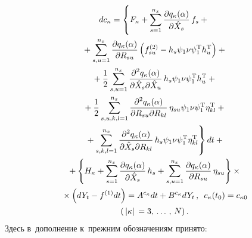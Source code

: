 \begin{multicols}{2}
\noindent
\begin{multline}
dc_\kappa =\left\{ 
\vphantom{\sss_{s,k,l=1}^{n_x}}
F_\kappa +\sss_{s=1}^{n_x} \fr{\partial q_\kappa
    (\alp)}{\partial \hat X_s}\,f_s +{}\right.\\
    {}+\sss_{s,u=1}^{n_x} \fr{\partial
    q_\kappa (\alp)}{\partial R_{su}} \left( 
    f_{su}^{(2)} - h_s \psi_1\nu\psi_1^{\mathrm{T}} h_u^{\mathrm{T}}\right)+{}\\
{}+\fr{1}{2}\sss_{s,u=1}^{n_x} \fr{\partial^2 q_\kappa (\alp)}
{\partial \hat X_s \partial \hat X_u}\, 
    h_s \psi_1\nu\psi_1^{\mathrm{T}} h_u^{\mathrm{T}} +{}\\
    {}+ \fr{1}{2}
    \sss_{s,u,k,l=1}^{n_x} \fr{\partial^2 q_\kappa (\alp)}
    {\partial R_{su}\partial R_{kl}}\,
    \eta_{su} \psi_1\nu\psi_1^{\mathrm{T}} \eta_{kl}^{\mathrm{T}}+{}\\
\left.{}+\sss_{s,k,l=1}^{n_x} \fr{\partial^2 q_\kappa (\alp)}
{\partial \hat X_s \partial R_{kl}}\,h_s \psi_1\nu\psi_1^{\mathrm{T}} 
\eta_{kl}^{\mathrm{T}}\right\} dt +{}\\
{}+\left\{ H_\kappa +
    \sss_{s=1}^{n_x} \fr{\partial q_\kappa (\alp)}{\partial \hat X_s}\,h_s 
+\sss_{s,u=1}^{n_x} \fr{\partial
    q_\kappa (\alp)}{\partial R_{su}}\,\eta_{su}\right\}\times{}
    \\
    {}\times
     \left(dY_t -
    f^{(1)} dt\right)= A^{c_\kappa} dt + B^{c_\kappa} dY_t\,,\enskip 
    c_\kappa (t_0) = c_{\kappa0} \\
     (\lv\kappa\rv= 3\tr N)\,.
    \label{e3.10-s1}
    \end{multline}
Здесь в~дополнение к~прежним обозначениям принято:

\vspace*{4pt}


\end{multicols}
